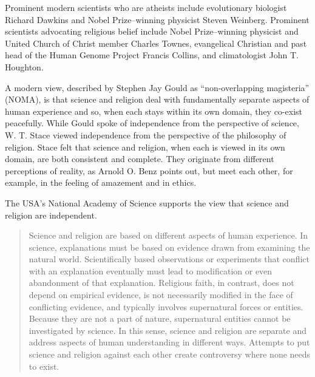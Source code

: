 \documentclass[
]{article}
\begin{document}
Prominent modern scientists who are atheists include evolutionary
biologist Richard Dawkins and Nobel Prize--winning physicist Steven
Weinberg. Prominent scientists advocating religious belief include Nobel
Prize--winning physicist and United Church of Christ member Charles
Townes, evangelical Christian and past head of the Human Genome Project
Francis Collins, and climatologist John T. Houghton.

A modern view, described by Stephen Jay Gould as ``non-overlapping
magisteria'' (NOMA), is that science and religion deal with
fundamentally separate aspects of human experience and so, when each
stays within its own domain, they co-exist peacefully. While Gould spoke
of independence from the perspective of science, W. T. Stace viewed
independence from the perspective of the philosophy of religion. Stace
felt that science and religion, when each is viewed in its own domain,
are both consistent and complete. They originate from different
perceptions of reality, as Arnold O. Benz points out, but meet each
other, for example, in the feeling of amazement and in ethics.

The USA's National Academy of Science supports the view that science and
religion are independent.

\begin{quote}
Science and religion are based on different aspects of human experience.
In science, explanations must be based on evidence drawn from examining
the natural world. Scientifically based observations or experiments that
conflict with an explanation eventually must lead to modification or
even abandonment of that explanation. Religious faith, in contrast, does
not depend on empirical evidence, is not necessarily modified in the
face of conflicting evidence, and typically involves supernatural forces
or entities. Because they are not a part of nature, supernatural
entities cannot be investigated by science. In this sense, science and
religion are separate and address aspects of human understanding in
different ways. Attempts to put science and religion against each other
create controversy where none needs to exist.
\end{quote}
\end{document}
